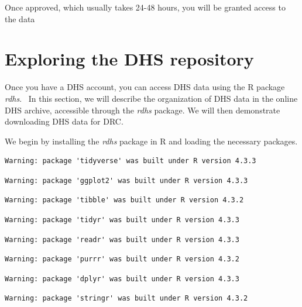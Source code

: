 \documentclass[
  letterpaper,
  DIV=11,
  numbers=noendperiod]{scrreprt}
\begin{document}
Once approved, which usually takes 24-48 hours, you will be granted
access to the data


\hypertarget{exploring-the-dhs-repository}{%
\chapter{\texorpdfstring{\textbf{Exploring the DHS
repository}}{Exploring the DHS repository}}\label{exploring-the-dhs-repository}}

Once you have a DHS account, you can access DHS data using the R package
\emph{rdhs}.~ In this section, we will describe the organization of DHS
data in the online DHS archive, accessible through the \emph{rdhs}
package. We will then demonstrate downloading DHS data for DRC.

We begin by installing the \emph{rdhs} package in R and loading the
necessary packages.

\begin{verbatim}
Warning: package 'tidyverse' was built under R version 4.3.3
\end{verbatim}

\begin{verbatim}
Warning: package 'ggplot2' was built under R version 4.3.3
\end{verbatim}

\begin{verbatim}
Warning: package 'tibble' was built under R version 4.3.2
\end{verbatim}

\begin{verbatim}
Warning: package 'tidyr' was built under R version 4.3.3
\end{verbatim}

\begin{verbatim}
Warning: package 'readr' was built under R version 4.3.3
\end{verbatim}

\begin{verbatim}
Warning: package 'purrr' was built under R version 4.3.2
\end{verbatim}

\begin{verbatim}
Warning: package 'dplyr' was built under R version 4.3.3
\end{verbatim}

\begin{verbatim}
Warning: package 'stringr' was built under R version 4.3.2
\end{verbatim}
\end{document}
